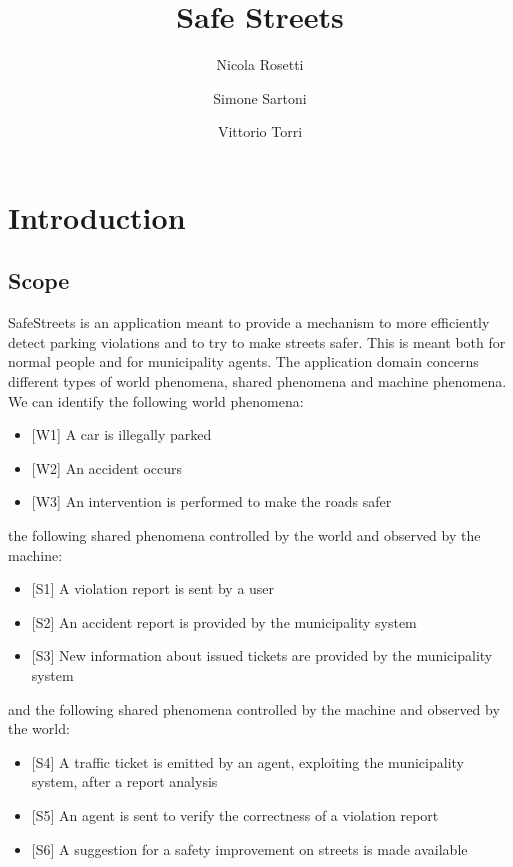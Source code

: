 \documentclass[a4paper]{report}
\begin{document}
\titleformat{\chapter}[hang] 
{\normalfont\huge\bfseries}{\thechapter}{1em}{} 

\author{Nicola Rosetti \and Simone Sartoni \and Vittorio Torri}
\title{Safe Streets}
\date{}
\maketitle

\tableofcontents
\listoffigures

\chapter{Introduction}
\section{Scope}
SafeStreets is an application meant to provide a mechanism to more efficiently detect parking violations and to try to make streets safer. This is meant both for normal people and for municipality agents. 
The application domain concerns different types of world phenomena, shared phenomena and machine phenomena. \\
We can identify the following world phenomena:
\begin{itemize}
\item {[W1]} \label{W1}A car is illegally parked 
\item {[W2]} \label{W2}An accident occurs
\item {[W3]} \label{W3}An intervention is performed to make the roads safer
\end{itemize} 
the following shared phenomena controlled by the world and observed by the machine:
\begin{itemize}
\item {[S1]} A violation report is sent by a user
\item {[S2]} An accident report is provided by the municipality system
\item {[S3]} New information about issued tickets are provided by the municipality system
\end{itemize}
and the following shared phenomena controlled by the machine and observed by the world:
\begin{itemize}
\item {[S4]} A traffic ticket is emitted by an agent, exploiting the municipality system, after a report analysis
\item {[S5]} An agent is sent to verify the correctness of a violation report
\item {[S6]} A suggestion for a safety improvement on streets is made available
\end{itemize}
\end{document}
